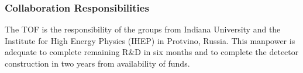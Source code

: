 \subsubsection*{Collaboration Responsibilities}

The TOF is the responsibility of the groups from Indiana University and the Institute for
High Energy Physics (IHEP) in Protvino, Russia.  This manpower is adequate to complete
remaining R\&D in six months and to complete the detector construction in
two years from availability of funds.

